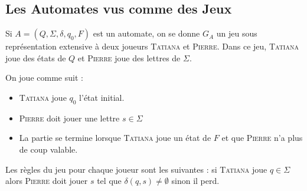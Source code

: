 \documentclass{cours}
\begin{document}
\subsection{Les Automates vus comme des Jeux}
\begin{definition}
    Si $A = \left(Q, \Sigma, \delta, q_{0}, F\right)$ est un automate, on se donne $G_{A}$ un jeu sous représentation extensive à deux joueurs \textsc{Tatiana} et \textsc{Pierre}. Dans ce jeu, \textsc{Tatiana} joue des états de $Q$ et \textsc{Pierre} joue des lettres de $\Sigma$.
\end{definition}
On joue comme suit :
\begin{itemize}
    \item \textsc{Tatiana} joue $q_{0}$ l'état initial.
    \item \textsc{Pierre} doit jouer une lettre $s \in \Sigma$
    \item La partie se termine lorsque \textsc{Tatiana} joue un état de $F$ et que \textsc{Pierre} n'a plus de coup valable.
\end{itemize}

\begin{definition}
    Les règles du jeu pour chaque joueur sont les suivantes : si \textsc{Tatiana} joue $q \in \Sigma$ alors \textsc{Pierre} doit jouer $s$ tel que $\delta(q, s) \neq \emptyset$ sinon il perd.
\end{definition}
\end{document}
